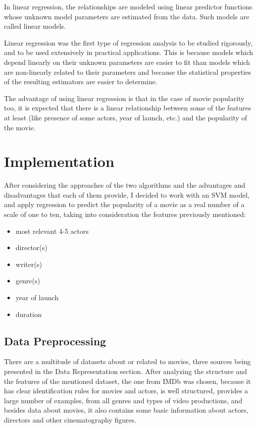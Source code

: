 \documentclass[a4paper,10pt]{article}
\begin{document}
In linear regression, the relationships are modeled using linear predictor functions whose unknown model parameters are estimated from the data. Such models are called linear models.

Linear regression was the first type of regression analysis to be studied rigorously, and to be used extensively in practical applications. This is because models which depend linearly on their unknown parameters are easier to fit than models which are non-linearly related to their parameters and because the statistical properties of the resulting estimators are easier to determine.

The advantage of using linear regression is that in the case of movie popularity too, it is expected that there is a linear relationship between some of the features at least (like presence of some actors, year of launch, etc.) and the popularity of the movie.

\section{Implementation} 
After considering the approaches of the two algorithms and the advantages and disadvantages that each of them provide, I decided to work with an SVM model, and apply regression to predict the popularity of a movie as a real number of a scale of one to ten, taking into consideration the features previously mentioned:
\begin{itemize}
	\item most relevant 4-5 actors
	\item director(s)
	\item writer(s)
	\item genre(s)
	\item year of launch
	\item duration
\end{itemize}
\subsection{Data Preprocessing}
There are a multitude of datasets about or related to movies, three sources being presented in the Data Representation section. After analyzing the structure and the features of the mentioned dataset, the one from IMDb was chosen, because it has clear identification rules for movies and actors, is well structured, provides a large number of examples, from all genres and types of video productions, and besides data about movies, it also contains some basic information about actors, directors and other cinematography figures.
\end{document}
